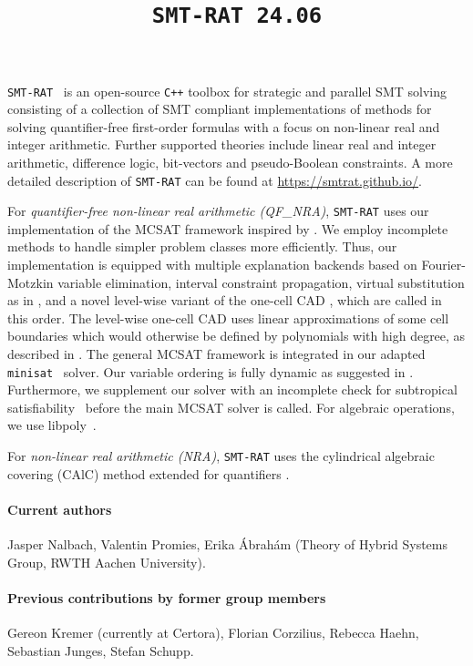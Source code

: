 \documentclass{article}
\title{\texttt{SMT-RAT 24.06}}
\begin{document}
\maketitle

\texttt{SMT-RAT}~\cite{Corzilius2015} is an open-source \texttt{C++} toolbox for strategic and parallel SMT solving consisting of a collection of SMT compliant implementations of methods for
solving quantifier-free first-order formulas with a focus on non-linear real and integer arithmetic.
Further supported theories include linear real and integer arithmetic, difference logic, bit-vectors and pseudo-Boolean constraints.
A more detailed description of \texttt{SMT-RAT} can be found at \href{https://smtrat.github.io/}{\color{blue}https://smtrat.github.io/}.


For \emph{quantifier-free non-linear real arithmetic (QF\_NRA)}, \texttt{SMT-RAT} uses our implementation of the MCSAT framework \cite{Moura2013} inspired by \cite{jovanovic2012solving}.
We employ incomplete methods to handle simpler problem classes more efficiently.
Thus, our implementation is equipped with multiple explanation backends based on Fourier-Motzkin variable elimination, interval constraint propagation, virtual substitution as in \cite{Abraham2017}, and a novel level-wise variant of the one-cell CAD \cite{brown2015constructing,nalbach2024}, which are called in this order.
The level-wise one-cell CAD uses linear approximations of some cell boundaries which would otherwise be defined by polynomials with high degree, as described in \cite{promies_msc}.
The general MCSAT framework is integrated in our adapted \texttt{minisat}~\cite{Een2003} solver.
Our variable ordering is fully dynamic as suggested in \cite{Jovanovic2013}.
Furthermore, we supplement our solver with an incomplete check for subtropical satisfiability~\cite{Fontaine2017} before the main MCSAT solver is called.
For algebraic operations, we use libpoly~\cite{libpoly}.

For \emph{non-linear real arithmetic (NRA)}, \texttt{SMT-RAT} uses the cylindrical algebraic covering (CAlC) method \cite{Abraham2020} extended for quantifiers \cite{kremer2023}.


\paragraph{Current authors}
Jasper Nalbach, Valentin Promies, Erika \'Abrah\'am
(Theory of Hybrid Systems Group, RWTH Aachen University).

\paragraph{Previous contributions by former group members}
Gereon Kremer (currently at Certora),
Florian Corzilius,
Rebecca Haehn,
Sebastian Junges,
Stefan Schupp.




\end{document}
